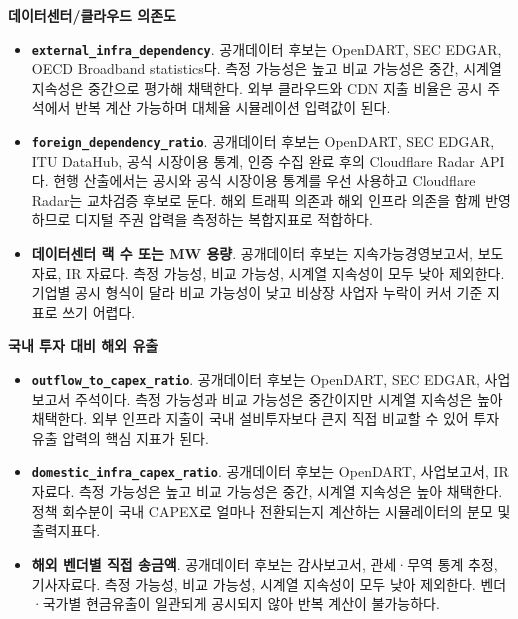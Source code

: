 \documentclass[11pt,a4paper]{report}
\newenvironment{summarylist}{\begin{itemize}[leftmargin=1.8em,itemsep=0.35em,topsep=0.35em]\RaggedRight}{\end{itemize}}
\begin{document}
\noindent\textbf{데이터센터/클라우드 의존도}
\begin{summarylist}
  \item \textbf{\texttt{external\_infra\_dependency}}. 공개데이터 후보는 OpenDART, SEC EDGAR, OECD Broadband statistics다. 측정 가능성은 높고 비교 가능성은 중간, 시계열 지속성은 중간으로 평가해 채택한다. 외부 클라우드와 CDN 지출 비율은 공시 주석에서 반복 계산 가능하며 대체율 시뮬레이션 입력값이 된다.
  \item \textbf{\texttt{foreign\_dependency\_ratio}}. 공개데이터 후보는 OpenDART, SEC EDGAR, ITU DataHub, 공식 시장이용 통계, 인증 수집 완료 후의 Cloudflare Radar API다. 현행 산출에서는 공시와 공식 시장이용 통계를 우선 사용하고 Cloudflare Radar는 교차검증 후보로 둔다. 해외 트래픽 의존과 해외 인프라 의존을 함께 반영하므로 디지털 주권 압력을 측정하는 복합지표로 적합하다.
  \item \textbf{데이터센터 랙 수 또는 MW 용량}. 공개데이터 후보는 지속가능경영보고서, 보도자료, IR 자료다. 측정 가능성, 비교 가능성, 시계열 지속성이 모두 낮아 제외한다. 기업별 공시 형식이 달라 비교 가능성이 낮고 비상장 사업자 누락이 커서 기준 지표로 쓰기 어렵다.
\end{summarylist}

\noindent\textbf{국내 투자 대비 해외 유출}
\begin{summarylist}
  \item \textbf{\texttt{outflow\_to\_capex\_ratio}}. 공개데이터 후보는 OpenDART, SEC EDGAR, 사업보고서 주석이다. 측정 가능성과 비교 가능성은 중간이지만 시계열 지속성은 높아 채택한다. 외부 인프라 지출이 국내 설비투자보다 큰지 직접 비교할 수 있어 투자 유출 압력의 핵심 지표가 된다.
  \item \textbf{\nolinkurl{domestic_infra_capex_ratio}}. 공개데이터 후보는 OpenDART, 사업보고서, IR 자료다. 측정 가능성은 높고 비교 가능성은 중간, 시계열 지속성은 높아 채택한다. 정책 회수분이 국내 CAPEX로 얼마나 전환되는지 계산하는 시뮬레이터의 분모 및 출력지표다.
  \item \textbf{해외 벤더별 직접 송금액}. 공개데이터 후보는 감사보고서, 관세·무역 통계 추정, 기사자료다. 측정 가능성, 비교 가능성, 시계열 지속성이 모두 낮아 제외한다. 벤더·국가별 현금유출이 일관되게 공시되지 않아 반복 계산이 불가능하다.
\end{summarylist}
\end{document}

